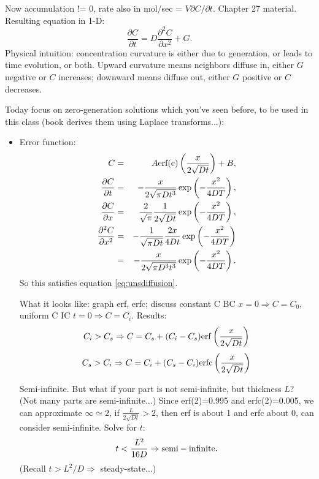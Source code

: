 \documentclass{report}
\begin{document}
Now accumulation != 0, rate also in mol/sec = $V \partial C/\partial t$.
Chapter 27 material.  Resulting equation in 1-D:
\begin{equation}
  \label{eq:unsdiffusion}
  \frac{\partial C}{\partial t} = D\frac{\partial^2C}{\partial x^2} + G.
\end{equation}
Physical intuition: concentration curvature is either due to generation, or
leads to time evolution, or both.  Upward curvature means neighbors diffuse in,
either $G$ negative or $C$ increases; downward means diffuse out, either $G$
positive or $C$ decreases.

Today focus on zero-generation solutions which you've seen before, to be used
in this class (book derives them using Laplace transforms...):
\begin{itemize}
\item Error function:
  \begin{eqnarray}
    \label{eq:erfsol}
    C &=& A{\rm erf(c)} \left(\frac{x}{2\sqrt{Dt}}\right) + B, \\
    \frac{\partial C}{\partial t} &=& -\frac{x}{2\sqrt{\pi Dt^3}}
    \exp\left(-\frac{x^2}{4DT}\right), \\
    \frac{\partial C}{\partial x} &=& \frac{2}{\sqrt{\pi}}\frac{1}{2\sqrt{Dt}}
    \exp\left(-\frac{x^2}{4DT}\right), \\
    \frac{\partial^2C}{\partial x^2} &=& -\frac{1}{\sqrt{\pi Dt}}\frac{2x}{4Dt}
    \exp\left(-\frac{x^2}{4DT}\right) \\
    &=& -\frac{x}{2\sqrt{\pi D^3t^3}} \exp\left(-\frac{x^2}{4DT}\right).
  \end{eqnarray}
  So this satisfies equation \ref{eq:unsdiffusion}.

  What it looks like: graph erf, erfc; discuss constant C BC $x=0\Rightarrow
  C=C_0$, uniform C IC $t=0\Rightarrow C=C_i$.  Results:
  \begin{equation}
    \label{eq:erfit}
    C_i>C_s \Rightarrow
    C = C_s + (C_i-C_s) {\rm erf}\left(\frac{x}{2\sqrt{Dt}}\right)
  \end{equation}
  \begin{equation}
    \label{eq:erfcfit}
    C_s>C_i \Rightarrow
    C = C_i + (C_s-C_i) {\rm erfc}\left(\frac{x}{2\sqrt{Dt}}\right)
  \end{equation}

  Semi-infinite.  But what if your part is not semi-infinite, but thickness
  $L$?  (Not many parts are semi-infinite...)  Since erf(2)=0.995 and
  erfc(2)=0.005, we can approximate $\infty\simeq 2$, if
  $\frac{L}{2\sqrt{Dt}}>2$, then erf is about 1 and erfc about 0, can consider
  semi-infinite.  Solve for $t$:
  \begin{equation}
    \label{eq:seminf}
    t < \frac{L^2}{16D} \Rightarrow {\rm semi-infinite}.
  \end{equation}
  (Recall $t>L^2/D\Rightarrow$ steady-state...)


\end{itemize}
\end{document}
